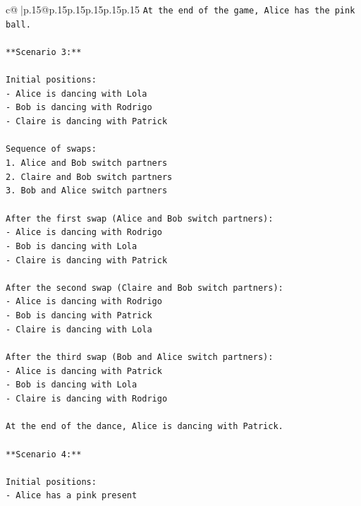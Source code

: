 \documentclass{article}
\begin{document}
{\begin{supertabular}{c@{$\;$}|p{.15\linewidth}@{}p{.15\linewidth}p{.15\linewidth}p{.15\linewidth}p{.15\linewidth}p{.15\linewidth}}
{{{\texttt{At the end of the game, Alice has the pink ball.} \\
\\ 
\texttt{**Scenario 3:**} \\
\\ 
\texttt{Initial positions:} \\
\texttt{{-} Alice is dancing with Lola} \\
\texttt{{-} Bob is dancing with Rodrigo} \\
\texttt{{-} Claire is dancing with Patrick} \\
\\ 
\texttt{Sequence of swaps:} \\
\texttt{1. Alice and Bob switch partners} \\
\texttt{2. Claire and Bob switch partners} \\
\texttt{3. Bob and Alice switch partners} \\
\\ 
\texttt{After the first swap (Alice and Bob switch partners):} \\
\texttt{{-} Alice is dancing with Rodrigo} \\
\texttt{{-} Bob is dancing with Lola} \\
\texttt{{-} Claire is dancing with Patrick} \\
\\ 
\texttt{After the second swap (Claire and Bob switch partners):} \\
\texttt{{-} Alice is dancing with Rodrigo} \\
\texttt{{-} Bob is dancing with Patrick} \\
\texttt{{-} Claire is dancing with Lola} \\
\\ 
\texttt{After the third swap (Bob and Alice switch partners):} \\
\texttt{{-} Alice is dancing with Patrick} \\
\texttt{{-} Bob is dancing with Lola} \\
\texttt{{-} Claire is dancing with Rodrigo} \\
\\ 
\texttt{At the end of the dance, Alice is dancing with Patrick.} \\
\\ 
\texttt{**Scenario 4:**} \\
\\ 
\texttt{Initial positions:} \\
\texttt{{-} Alice has a pink present} \\
}}}
\end{supertabular}}
\end{document}
